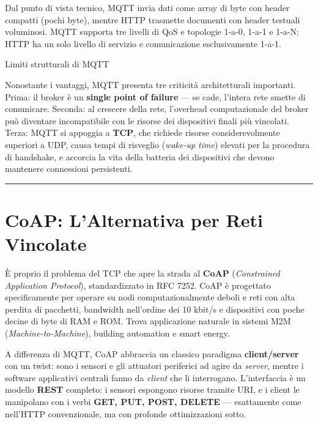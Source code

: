 \documentclass[
  italian,
  openany]{book}
\begin{document}
Dal punto di vista tecnico, MQTT invia dati come array di byte con
header compatti (pochi byte), mentre HTTP trasmette documenti con header
testuali voluminosi. MQTT supporta tre livelli di QoS e topologie 1-a-0,
1-a-1 e 1-a-N; HTTP ha un solo livello di servizio e comunicazione
esclusivamente 1-a-1.

\begin{calloutwarning}{Limiti strutturali di MQTT}

Nonostante i vantaggi, MQTT presenta tre criticità architetturali
importanti. Prima: il broker è un \textbf{single point of failure} ---
se cade, l'intera rete smette di comunicare. Seconda: al crescere della
rete, l'overhead computazionale del broker può diventare incompatibile
con le risorse dei dispositivi finali più vincolati. Terza: MQTT si
appoggia a \textbf{TCP}, che richiede risorse considerevolmente
superiori a UDP, causa tempi di risveglio (\emph{wake-up time}) elevati
per la procedura di handshake, e accorcia la vita della batteria dei
dispositivi che devono mantenere connessioni persistenti.

\end{calloutwarning}

\begin{center}\rule{0.5\linewidth}{0.5pt}\end{center}

\section{CoAP: L'Alternativa per Reti
Vincolate}\label{coap-lalternativa-per-reti-vincolate}

È proprio il problema del TCP che apre la strada al \textbf{CoAP}
(\emph{Constrained Application Protocol}), standardizzato in RFC 7252.
CoAP è progettato specificamente per operare su nodi computazionalmente
deboli e reti con alta perdita di pacchetti, bandwidth nell'ordine dei
10 kbit/s e dispositivi con poche decine di byte di RAM e ROM. Trova
applicazione naturale in sistemi M2M (\emph{Machine-to-Machine}),
building automation e smart energy.

A differenza di MQTT, CoAP abbraccia un classico paradigma
\textbf{client/server} con un twist: sono i sensori e gli attuatori
periferici ad agire da \emph{server}, mentre i software applicativi
centrali fanno da \emph{client} che li interrogano. L'interfaccia è un
modello \textbf{REST} completo: i sensori espongono risorse tramite URI,
e i client le manipolano con i verbi \textbf{GET, PUT, POST, DELETE} ---
esattamente come nell'HTTP convenzionale, ma con profonde ottimizzazioni
sotto.
\end{document}
